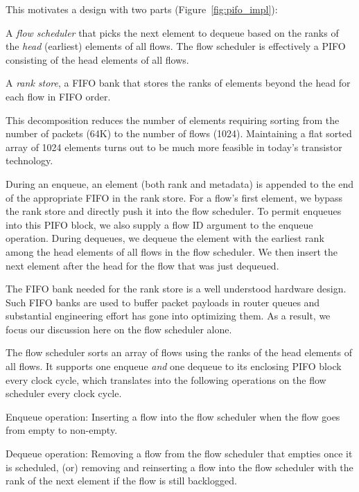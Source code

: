 This motivates a design with two parts (Figure~\ref{fig:pifo_impl}):
\begin{CompactEnumerate}
\item A {\em flow scheduler} that picks the next element to dequeue based on
the ranks of the {\em head} (earliest) elements of all flows. The flow
scheduler is effectively a PIFO consisting of the head elements of all flows.
\item A {\em rank store}, a FIFO bank that stores the ranks of elements beyond
the head for each flow in FIFO order.
\end{CompactEnumerate}

This decomposition reduces the number of elements requiring sorting from the
number of packets (64K) to the number of flows (1024). Maintaining a flat
sorted array of 1024 elements turns out to be much more feasible in today's
transistor technology.

During an enqueue, an element (both rank and metadata) is appended to the end
of the appropriate FIFO in the rank store. For a flow's first element, we
bypass the rank store and directly push it into the flow scheduler. To permit
enqueues into this PIFO block, we also supply a flow ID argument to the enqueue
operation. During dequeues, we dequeue the element with the earliest rank among
the head elements of all flows in the flow scheduler.  We then insert the next
element after the head for the flow that was just dequeued.

The FIFO bank needed for the rank store is a well understood hardware design.
Such FIFO banks are used to buffer packet payloads in router queues and
substantial engineering effort has gone into optimizing them.  As a result, we
focus our discussion here on the flow scheduler alone.

The flow scheduler sorts an array of flows using the ranks of the head elements
of all flows. It supports one enqueue {\em and} one dequeue to its enclosing
PIFO block every clock cycle, which translates into the following operations on
the flow scheduler every clock cycle.
\begin{CompactEnumerate}
  \item Enqueue operation: Inserting a flow into the flow scheduler 
  when the flow goes from empty to non-empty.
\item Dequeue operation: Removing a flow from the flow scheduler that empties
once it is scheduled, (or) removing and reinserting a flow into the flow
scheduler with the rank of the next element if the flow is still backlogged.
\end{CompactEnumerate}

